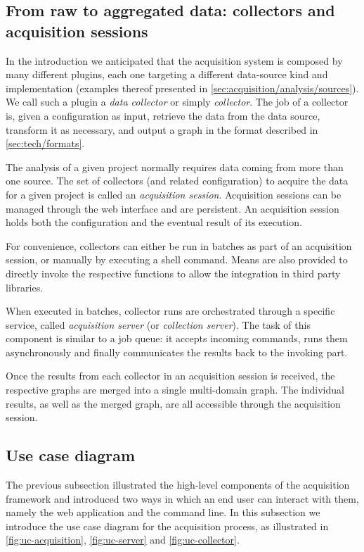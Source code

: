\subsection{From raw to aggregated data: collectors and acquisition sessions}

In the introduction we anticipated that the acquisition system is composed by many different plugins, each one targeting a different data-source kind and implementation (examples thereof presented in \vref{sec:acquisition/analysis/sources}). We call such a plugin a \emph{data collector} or simply \emph{collector}. The job of a collector is, given a configuration as input, retrieve the data from the data source, transform it as necessary, and output a graph in the format described in \vref{sec:tech/formats}.

The analysis of a given project normally requires data coming from more than one source. The set of collectors (and related configuration) to acquire the data for a given project is called an \emph{acquisition session}. Acquisition sessions can be managed through the web interface and are persistent. An acquisition session holds both the configuration and the eventual result of its execution.

For convenience, collectors can either be run in batches as part of an acquisition session, or manually by executing a shell command. Means are also provided to directly invoke the respective functions to allow the integration in third party libraries.

When executed in batches, collector runs are orchestrated through a specific service, called \emph{acquisition server} (or \emph{collection server}). The task of this component is similar to a job queue: it accepts incoming commands, runs them asynchronously and finally communicates the results back to the invoking part.

Once the results from each collector in an acquisition session is received, the respective graphs are merged into a single multi-domain graph. The individual results, as well as the merged graph, are all accessible through the acquisition session.

\subsection{Use case diagram}

The previous subsection illustrated the high-level components of the acquisition framework and introduced two ways in which an end user can interact with them, namely the web application and the command line. In this subsection we introduce the use case diagram for the acquisition process, as illustrated in \ref{fig:uc-acquisition}, \ref{fig:uc-server} and \vref{fig:uc-collector}.

